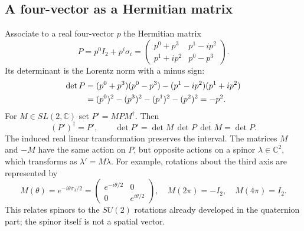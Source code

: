 \subsection{A four-vector as a Hermitian matrix}
Associate to a real four-vector $p$ the Hermitian matrix
\begin{equation}\label{qft:hermitian-vector}
 P=p^0I_2+p^i\sigma_i
 =\begin{pmatrix}p^0+p^3&p^1-ip^2\\p^1+ip^2&p^0-p^3\end{pmatrix}.
\end{equation}
Its determinant is the Lorentz norm with a minus sign:
\begin{align}
 \det P&=(p^0+p^3)(p^0-p^3)-(p^1-ip^2)(p^1+ip^2)\notag\\
 &=(p^0)^2-(p^3)^2-(p^1)^2-(p^2)^2=-p^2.
 \label{qft:hermitian-determinant}
\end{align}
For $M\in SL(2,\mathbb C)$ set $P'=MPM^\dagger$. Then
\begin{equation}\label{qft:sl2-action}
 (P')^\dagger=P',\qquad
 \det P'=\det M\,\det P\,\overline{\det M}=\det P.
\end{equation}
The induced real linear transformation preserves the interval. The matrices
$M$ and $-M$ have the same action on $P$, but opposite actions on a spinor
$\lambda\in\mathbb C^2$, which transforms as $\lambda'=M\lambda$.
For example, rotations about the third axis are represented by
\begin{equation}\label{qft:spinor-full-turn}
 M(\theta)=e^{-i\theta\sigma_3/2}
 =\begin{pmatrix}e^{-i\theta/2}&0\\0&e^{i\theta/2}\end{pmatrix},
 \quad M(2\pi)=-I_2,\quad M(4\pi)=I_2 .
\end{equation}
This relates spinors to the $SU(2)$ rotations already developed in the
quaternion part; the spinor itself is not a spatial vector.

